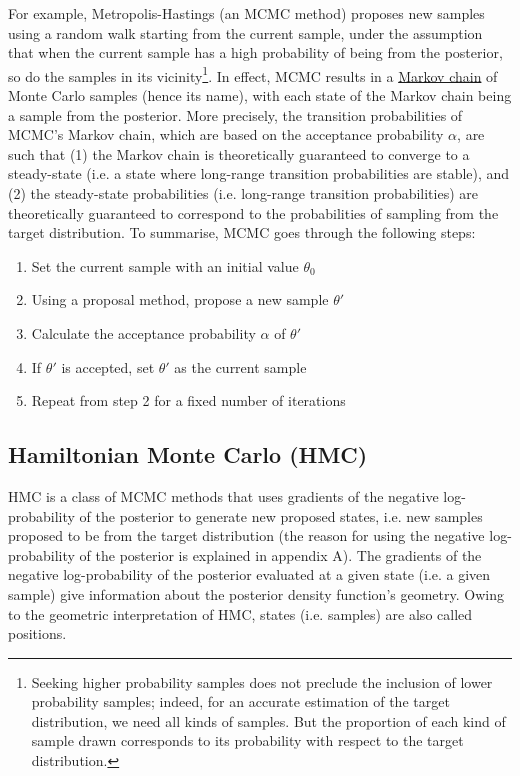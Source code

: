 \documentclass[conference]{IEEEtran}
\begin{document}
For example, Metropolis-Hastings (an MCMC method) proposes new samples using a random walk starting from the current sample, under the assumption that when the current sample has a high probability of being from the posterior, so do the samples in its vicinity\footnote{Seeking higher probability samples does not preclude the inclusion of lower probability samples; indeed, for an accurate estimation of the target distribution, we need all kinds of samples. But the proportion of each kind of sample drawn corresponds to its probability with respect to the target distribution.}. In effect, MCMC results in a \href{https://github.com/pranigopu/mastersProject/tree/main/conceptual-notes/markov-chains}{Markov chain} of Monte Carlo samples (hence its name), with each state of the Markov chain being a sample from the posterior. More precisely, the transition probabilities of MCMC's Markov chain, which are based on the acceptance probability $\alpha$, are such that (1) the Markov chain is theoretically guaranteed to converge to a steady-state (i.e. a state where long-range transition probabilities are stable), and (2) the steady-state probabilities (i.e. long-range transition probabilities) are theoretically guaranteed to correspond to the probabilities of sampling from the target distribution. To summarise, MCMC goes through the following steps:\\

\begin{enumerate}
    \item Set the current sample with an initial value $\theta_0$
    \item Using a proposal method, propose a new sample $\theta'$
    \item Calculate the acceptance probability $\alpha$ of $\theta'$
    \item If $\theta'$ is accepted, set $\theta'$ as the current sample
    \item Repeat from step 2 for a fixed number of iterations\\
\end{enumerate}

\subsection{Hamiltonian Monte Carlo (HMC)}
HMC is a class of MCMC methods that uses gradients of the negative log-probability of the posterior to generate new proposed states, i.e. new samples proposed to be from the target distribution (the reason for using the negative log-probability of the posterior is explained in appendix A). The gradients of the negative log-probability of the posterior evaluated at a given state (i.e. a given sample) give information about the posterior density function's geometry. Owing to the geometric interpretation of HMC, states (i.e. samples) are also called positions.\\
\end{document}
